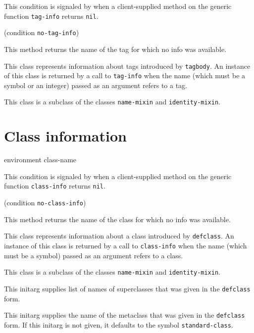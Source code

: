 This condition is signaled by \sysname{} when a client-supplied method
on the generic function \texttt{tag-info} returns \texttt{nil}.

 {(condition {\tt no-tag-info})}

This method returns the name of the tag for which no info was
available. 


This class represents information about tags introduced by
\texttt{tagbody}.  An instance of this class is returned by a call to
\texttt{tag-info} when the name (which must be a symbol or an integer)
passed as an argument refers to a tag.

This class is a subclass of the classes \texttt{name-mixin} and
\texttt{identity-mixin}.

\section{Class information}

 {environment class-name}


This condition is signaled by \sysname{} when a client-supplied method
on the generic function \texttt{class-info} returns \texttt{nil}.

 {(condition {\tt no-class-info})}

This method returns the name of the class for which no info was
available. 


This class represents information about a class introduced by
\texttt{defclass}.  An instance of this class is returned by a call to
\texttt{class-info} when the name (which must be a symbol)
passed as an argument refers to a class.

This class is a subclass of the classes \texttt{name-mixin} and
\texttt{identity-mixin}.


This initarg supplies list of names of superclasses that was given in
the \texttt{defclass} form.


This initarg supplies the name of the metaclass that was given in the
\texttt{defclass} form.  If this initarg is not given, it defaults to
the symbol \texttt{standard-class}.

